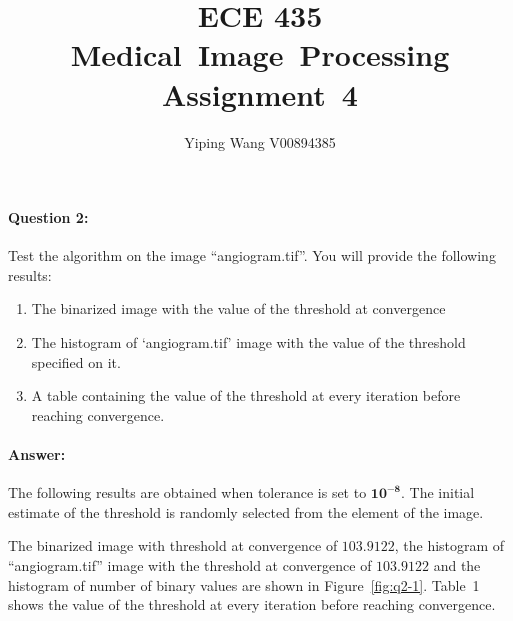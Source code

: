 \documentclass[12pt, letter]{article}
\newcommand{\courseName}{ECE 435 Medical~Image~Processing}
\newcommand{\assignName}{Assignment~4}
\begin{document}
\pagestyle{titlesec_assignment}

\title{\courseName\\\assignName}
\author{Yiping Wang V00894385}
\maketitle

\paragraph{Question 2:} Test the algorithm on the image ``angiogram.tif''. You will provide the following results:
\begin{enumerate}
    \item The binarized image with the value of the threshold at convergence
    \item The histogram of ‘angiogram.tif’ image with the value of the threshold specified on it.
    \item A table containing the value of the threshold at every iteration before reaching convergence.
\end{enumerate}

\paragraph{Answer:}
The following results are obtained when tolerance is set to $\mathbf{10^{-8}}$. The initial estimate of the threshold is randomly selected from the element of the image.  

The binarized image with threshold at convergence of $\mathbf{103.9122}$, the histogram of ``angiogram.tif'' image with the threshold at convergence of $\mathbf{103.9122}$ and the histogram of number of binary values are shown in Figure~\ref{fig:q2-1}. Table~1 shows the value of the threshold at every iteration before reaching convergence.
\end{document}
